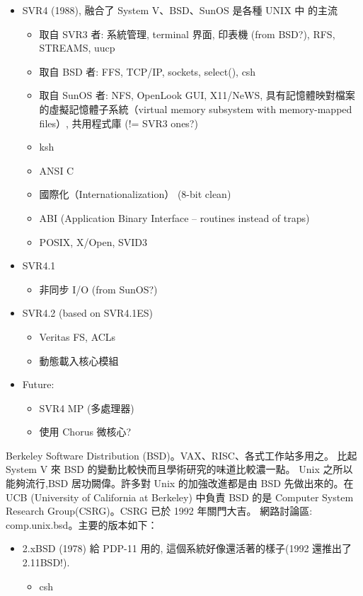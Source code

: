 \documentclass{article}
\begin{document}
\begin{CJK*}{Bg5}{ming}
{\begin{itemize}
         \item SVR4 (1988), 融合了 System V、BSD、SunOS 是各種 UNIX 中 
           的主流
	 \begin{itemize}
           \item 取自 SVR3 者: 系統管理, terminal 界面, 印表機 (from BSD?),
             RFS, STREAMS, uucp
           \item 取自 BSD 者: FFS, TCP/IP, sockets, select(), csh
           \item 取自 SunOS 者: NFS, OpenLook GUI, X11/NeWS,
             具有記憶體映對檔案的虛擬記憶體子系統（virtual memory
             subsystem with memory-mapped files）, 共用程式庫
             (!= SVR3 ones?)
           \item ksh
           \item ANSI C
           \item 國際化（Internationalization） (8-bit clean)
           \item ABI (Application Binary Interface -- routines instead of traps)
           \item POSIX, X/Open, SVID3
	 \end{itemize}

         \item SVR4.1
	 \begin{itemize}
           \item 非同步 I/O (from SunOS?)
	 \end{itemize}

         \item SVR4.2 (based on SVR4.1ES)
	 \begin{itemize}
           \item Veritas FS, ACLs
           \item 動態載入核心模組
	 \end{itemize}

         \item Future:
	 \begin{itemize}
           \item SVR4 MP (多處理器)
           \item 使用 Chorus 微核心?
	 \end{itemize}
\end{itemize}

    Berkeley Software Distribution (BSD)。VAX、RISC、各式工作站多用之。
    比起 System V 來 BSD 的變動比較快而且學術研究的味道比較濃一點。
    Unix 之所以能夠流行,BSD 居功闕偉。許多對 Unix 的加強改進都是由
    BSD 先做出來的。在 UCB (University of California at Berkeley) 中負責 BSD 
    的是 Computer System Research Group(CSRG)。CSRG 已於 1992 年關門大吉。
    網路討論區: comp.unix.bsd。主要的版本如下：
\begin{itemize}
         \item 2.xBSD (1978) 給 PDP-11 用的, 這個系統好像還活著的樣子(1992 
           還推出了 2.11BSD!).
	   \begin{itemize}
           \item csh
	   \end{itemize}


\end{itemize}}
\end{CJK*}
\end{document}
